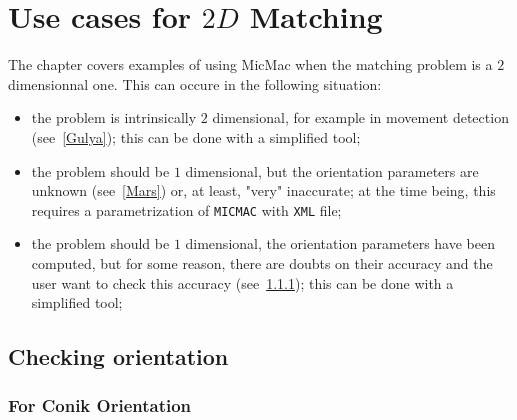 \chapter{Use cases for $2D$ Matching}

The chapter covers examples of using MicMac when the matching problem is
a $2$ dimensionnal one. This can occure in the following situation:


\begin{itemize}
   \item the problem is intrinsically $2$ dimensional, for example in
         movement detection (see~\ref{Gulya}); this can be done with a simplified tool;

   \item the problem should be $1$ dimensional, but the orientation parameters
         are unknown (see~\ref{Mars}) or, at least, "very" inaccurate; at the time being,
         this requires a parametrization of {\tt MICMAC} with {\tt XML} file;

   \item the problem should be $1$ dimensional, the orientation parameters have been computed,
         but for some reason, there are doubts on their accuracy and the user want to check
         this accuracy (see~\ref{CheckOri});  this can be done with a simplified tool;
\end{itemize}



\section{Checking orientation}\label{sec:MMTestOri}

\subsection{For Conik Orientation}
\label{CheckOri}

